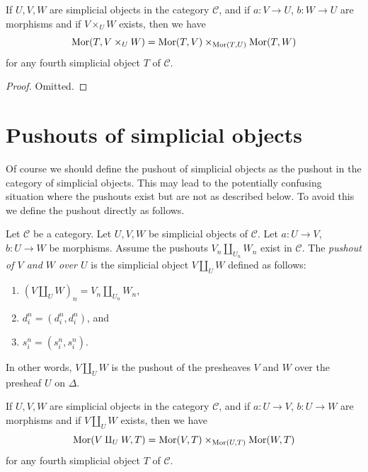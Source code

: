 \begin{lemma}
\label{lemma-fibre-product}
If $U, V, W$ are simplicial objects in the category $\mathcal{C}$,
and if $a : V \to U$, $b : W \to U$ are morphisms
and if $V \times_U W$ exists, then we have
$$
\mathop{\mathrm{Mor}}\nolimits(T, V \times_U W) =
\mathop{\mathrm{Mor}}\nolimits(T, V) \times_{\mathop{\mathrm{Mor}}\nolimits(T, U)}
\mathop{\mathrm{Mor}}\nolimits(T, W)
$$
for any fourth simplicial object $T$ of $\mathcal{C}$.
\end{lemma}

\begin{proof}
Omitted.
\end{proof}

\section{Pushouts of simplicial objects}
\label{section-push-outs}

\noindent
Of course we should define the pushout of simplicial objects
as the pushout in the category of simplicial objects. This
may lead to the potentially confusing situation where the
pushouts exist but are not as described below. To avoid
this we define the pushout directly as follows.

\begin{definition}
\label{definition-push-out}
Let $\mathcal{C}$ be a category.
Let $U, V, W$ be simplicial objects of $\mathcal{C}$.
Let $a : U \to V$, $b : U \to W$ be morphisms.
Assume the pushouts $V_n \amalg_{U_n} W_n$ exist in $\mathcal{C}$.
The {\it pushout of $V$ and $W$ over $U$} is the simplicial object
$V\amalg_U W$ defined as follows:
\begin{enumerate}
\item $(V \amalg_U W)_n = V_n \amalg_{U_n} W_n$,
\item $d^n_i = (d^n_i, d^n_i)$, and
\item $s^n_i = (s^n_i, s^n_i)$.
\end{enumerate}
In other words, $V\amalg_U W$ is the pushout of the presheaves
$V$ and $W$ over the presheaf $U$ on $\Delta$.
\end{definition}

\begin{lemma}
\label{lemma-push-out}
If $U, V, W$ are simplicial objects in the category $\mathcal{C}$,
and if $a : U \to V$, $b : U \to W$ are morphisms
and if $V\amalg_U W$ exists, then we have
$$
\mathop{\mathrm{Mor}}\nolimits(V\amalg_U W, T) =
\mathop{\mathrm{Mor}}\nolimits(V, T) \times_{\mathop{\mathrm{Mor}}\nolimits(U, T)}
\mathop{\mathrm{Mor}}\nolimits(W, T)
$$
for any fourth simplicial object $T$ of $\mathcal{C}$.
\end{lemma}

